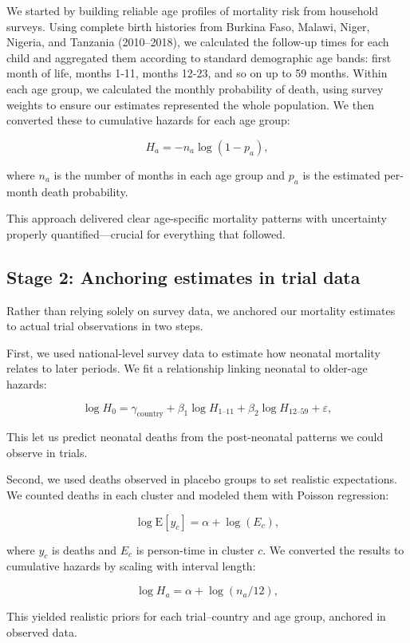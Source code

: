 \documentclass[11pt]{article}\usepackage[]{graphicx}\usepackage[]{xcolor}
\begin{document}
We started by building reliable age profiles of mortality risk from household surveys. Using complete birth histories from Burkina Faso, Malawi, Niger, Nigeria, and Tanzania (2010--2018), we calculated the follow-up times for each child and aggregated them according to standard demographic age bands: first month of life, months 1-11, months 12-23, and so on up to 59 months. Within each age group, we calculated the monthly probability of death, using survey weights to ensure our estimates represented the whole population. We then converted these to cumulative hazards for each age group:

\[
H_a = -n_a \log(1 - p_a),
\]

where $n_a$ is the number of months in each age group and $p_a$ is the estimated per-month death probability.

This approach delivered clear age-specific mortality patterns with uncertainty properly quantified---crucial for everything that followed.

\subsection{Stage 2: Anchoring estimates in trial data}

Rather than relying solely on survey data, we anchored our mortality estimates to actual trial observations in two steps.

First, we used national-level survey data to estimate how neonatal mortality relates to later periods. We fit a relationship linking neonatal to older-age hazards:

\[
\log H_{0} = \gamma_{\text{country}} + \beta_{1}\log H_{1\text{--}11} + \beta_{2}\log H_{12\text{--}59} + \varepsilon,
\]

This let us predict neonatal deaths from the post-neonatal patterns we could observe in trials.

Second, we used deaths observed in placebo groups to set realistic expectations. We counted deaths in each cluster and modeled them with Poisson regression:

\[
\log \mathrm{E}[y_c] = \alpha + \log(E_c),
\]

where $y_c$ is deaths and $E_c$ is person-time in cluster $c$. We converted the results to cumulative hazards by scaling with interval length:

\[
\log H_{a} = \alpha + \log(n_a/12),
\]

This yielded realistic priors for each trial--country and age group, anchored in observed data.
\end{document}
